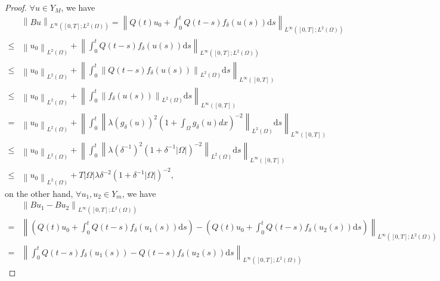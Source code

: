\documentclass{article}
\numberwithin{equation}{section}
\begin{document}
\begin{proof}
    $\forall u\in Y_M$, we have
    \begin{equation*}
    \begin{aligned}
    &\left\|Bu\right\| _{L^{\infty}\left([0, T] ; L^{2}(\Omega)\right)}=\left\|Q(t) u_{0}+\int_{0}^{t} Q(t-s) f_{\delta}(u(s)) \mathrm{d} s\right\| _{L^{\infty}\left([0, T] ; L^{2}(\Omega)\right)}
    \\ \le &  \left\|u_{0}\right\| _{ L^{2}\left(\Omega\right)}+\left\|\int_{0}^{t} Q(t-s) f_{\delta}(u(s)) \mathrm{d} s\right\|_{L^{\infty}\left([0, T] ; L^{2}(\Omega)\right)}
    \\ \le & \left\|u_{0}\right\|_{ L^{2}\left(\Omega\right)}+\left\|\int_{0}^{t} \left\|Q(t-s) f_{\delta}(u(s))\right\|_{ L^{2}\left(\Omega\right)} \mathrm{d} s \right\|_{L^{\infty}\left([0, T] \right)}
    \\ \le & \left\|u_{0}\right\|_{ L^{2}\left(\Omega\right)}+\left\|\int_{0}^{t} \left\|f_{\delta}(u(s))\right\|_{ L^{2}\left(\Omega\right)} \mathrm{d} s \right\|_{L^{\infty}\left([0, T] \right)}
    \\= & \left\|u_{0}\right\|_{ L^{2}\left(\Omega\right)}+\left\|\int_{0}^{t} \left\|\lambda\left(g_{\delta}(u)\right)^{2}\left(1+\int_{\Omega} g_{\delta}(u) d x\right)^{-2}\right\|_{ L^{2}\left(\Omega\right)} \mathrm{d} s \right\|_{L^{\infty}\left([0, T] \right)}
    \\ \le & \left\|u_{0}\right\|_{ L^{2}\left(\Omega\right)}+\left\|\int_{0}^{t} \left\|\lambda\left(\delta^{-1}\right)^{2}\left(1+\delta^{-1}|\Omega|\right)^{-2}\right\|_{ L^{2}\left(\Omega\right)} \mathrm{d} s \right\|_{L^{\infty}\left([0, T] \right)}
    \\ \le & \left\|u_{0}\right\|_{ L^{2}\left(\Omega\right)}
    +T|\Omega|\lambda\delta^{-2}
    \left(1+\delta^{-1}|\Omega|\right)^{-2},
    \end{aligned}
    \end{equation*}
    on the other hand, $\forall u_1, u_2\in Y_m$, we have
    \begin{equation*}
    \begin{aligned}
    &\left\|Bu_1-Bu_2\right\|_{L^{\infty}\left([0, T] ; L^{2}(\Omega)\right)}
    \\=&\left\|\left(Q(t) u_{0}+\int_{0}^{t} Q(t-s) f_{\delta}(u_1(s)) \mathrm{d} s\right)-\left(Q(t) u_{0}+\int_{0}^{t} Q(t-s) f_{\delta}(u_2(s)) \mathrm{d} s\right)\right\|_{L^{\infty}\left([0, T] ; L^{2}(\Omega)\right)}
    \\=&\left\|\int_{0}^{t} Q(t-s) f_{\delta}(u_1(s)) -Q(t-s) f_{\delta}(u_2(s)) \mathrm{d} s\right\|_{L^{\infty}\left([0, T] ; L^{2}(\Omega)\right)}

\end{aligned}
\end{equation*}
\end{proof}
\end{document}
